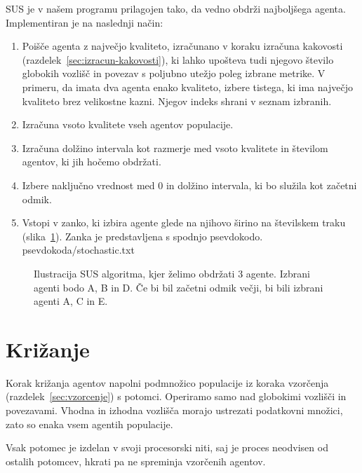 \documentclass[a4paper,12pt,openright]{book}
\newcommand{\lstlistingslo}{}
\begin{document}
    SUS je v našem programu prilagojen tako, da vedno obdrži najboljšega agenta.
    Implementiran je na naslednji način:
    \begin{enumerate}
        \item Poišče agenta z največjo kvaliteto, izračunano v koraku izračuna kakovosti (razdelek~\ref{sec:izracun-kakovosti}), ki
        lahko upošteva tudi njegovo število globokih vozlišč in povezav s poljubno utežjo poleg izbrane metrike.
        V primeru, da imata dva agenta enako kvaliteto, izbere tistega, ki ima največjo kvaliteto brez velikostne kazni.
        Njegov indeks shrani v seznam izbranih.
        \item Izračuna vsoto kvalitete vseh agentov populacije.
        \item Izračuna dolžino intervala kot razmerje med vsoto kvalitete in številom agentov, ki jih hočemo obdržati.
        \item Izbere naključno vrednost med 0 in dolžino intervala, ki bo služila kot začetni odmik.
        \item Vstopi v zanko, ki izbira agente glede na njihovo širino na številskem traku (slika~\ref{fig:sus}).
        Zanka je predstavljena s spodnjo psevdokodo.
        \lstlistingslo{psevdokoda/stochastic.txt}
    \end{enumerate}

    \begin{figure}[H]
        \begin{center}
            
        \end{center}
        \caption{Ilustracija SUS algoritma, kjer želimo obdržati 3 agente. Izbrani agenti bodo A, B in D. Če bi bil začetni odmik
        večji, bi bili izbrani agenti A, C in E.}
        \label{fig:sus}
    \end{figure}


    \section{Križanje}\label{sec:krizanje}
    Korak križanja agentov napolni podmnožico populacije iz koraka vzorčenja (razdelek~\ref{sec:vzorcenje}) s potomci.
    Operiramo samo nad globokimi vozlišči in povezavami.
    Vhodna in izhodna vozlišča morajo ustrezati podatkovni množici, zato so enaka vsem agentih populacije.

    Vsak potomec je izdelan v svoji procesorski niti, saj je proces neodvisen od ostalih potomcev, hkrati pa ne
    spreminja vzorčenih agentov.
\end{document}
